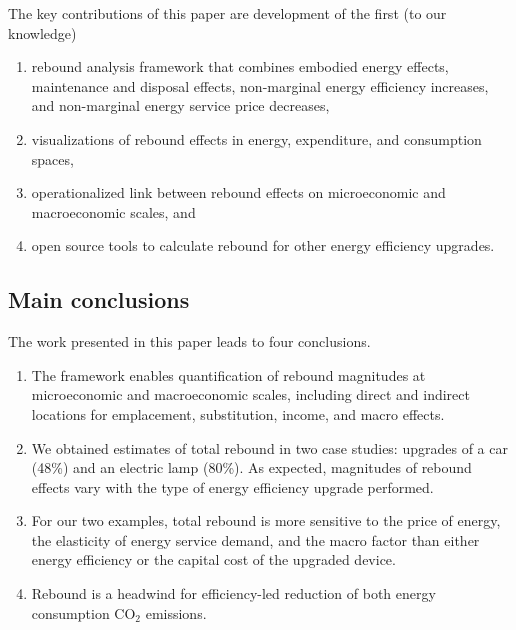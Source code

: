 \documentclass[12pt]{article}    %
\begin{document}
The key contributions of this paper are 
development of the first (to our knowledge)
%
\begin{enumerate}[label={(\roman*)}]
	
  \item rebound analysis framework that combines 
        embodied energy effects, 
        maintenance and disposal effects, 
        non-marginal energy efficiency increases, and 
        non-marginal energy service price decreases, 

  \item visualizations of rebound effects
        in energy, expenditure, and consumption spaces,
        
  \item operationalized link between 
        rebound effects on microeconomic and macroeconomic scales, and 
        
  \item open source tools to calculate rebound 
        for other energy efficiency upgrades.
  
\end{enumerate}


\subsection*{Main conclusions}
\label{sec:conclusions}

The work presented in this paper leads to four conclusions.
%
\begin{enumerate}[label={(\roman*)}]

  \item The framework enables
        quantification of rebound magnitudes at microeconomic and macroeconomic scales, including 
        direct and indirect locations 
        for emplacement, substitution, income, and macro effects.
        
  \item We obtained estimates of total rebound in two case studies: 
        upgrades of a car (48\%) and an electric lamp (80\%).
        As expected, magnitudes of rebound effects
        vary with the type of energy efficiency upgrade performed.
        
  \item For our two examples, total rebound is   
        more sensitive to
        the price of energy,
        the elasticity of energy service demand, and
        the macro factor
        than either
        energy efficiency or
        the capital cost of the upgraded device.
        
  \item Rebound is a headwind for efficiency-led reduction of both energy consumption 
        CO$_2$ emissions.

\end{enumerate}
\end{document}
